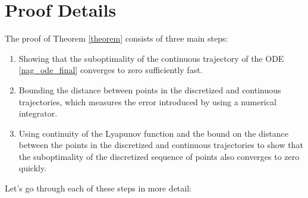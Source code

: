 \section{Proof Details}
\label{proof}
The proof of Theorem \ref{theorem} consists of three main steps:

\begin{enumerate}
    \item Showing that the suboptimality of the continuous trajectory of the ODE \eqref{nag_ode_final} converges to zero sufficiently fast.

    \item Bounding the distance between points in the discretized and continuous trajectories, which measures the error introduced by using a numerical integrator.

    \item Using continuity of the Lyapunov function and the bound on the distance between the points in the discretized and continuous trajectories to show that the suboptimality of the discretized sequence of points also converges to zero quickly.
\end{enumerate}

Let's go through each of these steps in more detail:

